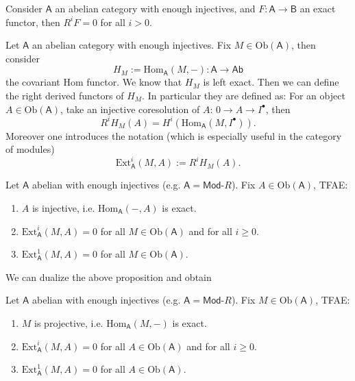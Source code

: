\begin{lem}
	Consider $\mathsf{A}$ an abelian category with enough injectives, and
	$F: \mathsf{A} \to \mathsf{B}$ an exact functor, then
	$R^iF = 0$ for all $i > 0$.
\end{lem} 

\begin{ex}
	Let $\mathsf{A}$ an abelian category with enough injectives.
	Fix $M \in \mathrm{Ob} \left(\mathsf{A}\right)$, then consider
	\begin{equation}
	H_M := \mathrm{Hom}_{\mathsf{A}} \left( M, - \right): \mathsf{A} \to \mathsf{Ab}
	\end{equation} 
	the covariant Hom functor.
	We know that $H_M$ is left exact.
	Then we can define the right derived functors of $H_M$.
	In particular they are defined as:
	For an object $A \in \mathrm{Ob} \left(\mathsf{A}\right)$,
	take an injective coresolution of $A$: $0 \to A \to I^\bullet$, then
	\begin{equation}
		R^iH_M(A) = H^i \left( \mathrm{Hom}_{\mathsf{A}} \left( M, I^\bullet \right) \right)
	.\end{equation} 
	Moreover one introduces the notation (which is especially useful in the category of modules)
	\begin{equation}
		\mathrm{Ext}_{\mathsf{A}}^i \left( M,A \right) := R^i H_M (A)
	.\end{equation} 
\end{ex} 

\begin{prop}
	Let $\mathsf{A}$ abelian with enough injectives
	(e.g. $\mathsf{A} = \mathsf{Mod}\text{-}R$).
	Fix $A \in \mathrm{Ob} \left(\mathsf{A}\right)$, TFAE:
	\begin{enumerate}
		\item $A$ is injective,
			i.e. $\mathrm{Hom}_{\mathsf{A}} \left( -, A \right)$ is exact.
		\item $\mathrm{Ext}^i_{\mathsf{A}}(M,A) = 0$ for all $M \in \mathrm{Ob} \left(\mathsf{A}\right)$
			and for all $i \geq 0$.
		\item $\mathrm{Ext}^1_{\mathsf{A}}(M,A) = 0$ for all $M \in \mathrm{Ob} \left(\mathsf{A}\right)$.
	\end{enumerate}
\end{prop} 
We can dualize the above proposition and obtain
\begin{prop}
	Let $\mathsf{A}$ abelian with enough injectives
	(e.g. $\mathsf{A} = \mathsf{Mod}\text{-}R$).
	Fix $M \in \mathrm{Ob} \left(\mathsf{A}\right)$, TFAE:
	\begin{enumerate}
		\item $M$ is projective,
			i.e. $\mathrm{Hom}_{\mathsf{A}} \left( M, - \right)$ is exact.
		\item $\mathrm{Ext}^i_{\mathsf{A}}(M,A) = 0$ for all $A \in \mathrm{Ob} \left(\mathsf{A}\right)$
			and for all $i \geq 0$.
		\item $\mathrm{Ext}^1_{\mathsf{A}}(M,A) = 0$ for all $A \in \mathrm{Ob} \left(\mathsf{A}\right)$.
	\end{enumerate}
\end{prop} 

